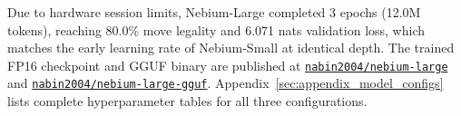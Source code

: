 Due to hardware session limits, Nebium-Large completed 3 epochs (12.0M tokens), reaching 80.0\% move legality and 6.071 nats validation loss, which matches the early learning rate of Nebium-Small at identical depth. The trained FP16 checkpoint and GGUF binary are published at \href{https://huggingface.co/nabin2004/nebium-large}{\texttt{nabin2004/nebium-large}} and \href{https://huggingface.co/nabin2004/nebium-large-gguf}{\texttt{nabin2004/nebium-large-gguf}}. Appendix~\ref{sec:appendix_model_configs} lists complete hyperparameter tables for all three configurations.
